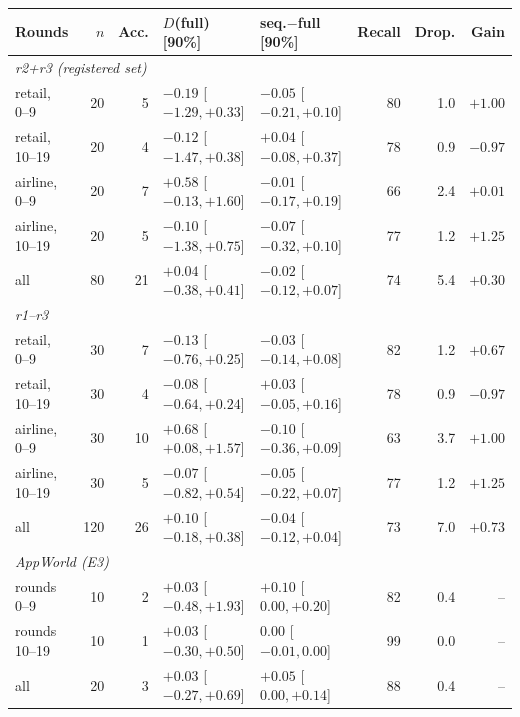 \begin{tabular}{@{}lrrllrrr@{}}
\toprule
Rounds & $n$ & Acc. & $D$(full) [90\%] & seq.$-$full [90\%] & Recall & Drop. & Gain \\
\midrule
\multicolumn{8}{l}{\emph{r2+r3 (registered set)}} \\
retail, 0--9 & 20 & 5 & $-0.19$ [$-1.29, +0.33$] & $-0.05$ [$-0.21, +0.10$] & 80 & 1.0 & $+1.00$ \\
retail, 10--19 & 20 & 4 & $-0.12$ [$-1.47, +0.38$] & $+0.04$ [$-0.08, +0.37$] & 78 & 0.9 & $-0.97$ \\
airline, 0--9 & 20 & 7 & $+0.58$ [$-0.13, +1.60$] & $-0.01$ [$-0.17, +0.19$] & 66 & 2.4 & $+0.01$ \\
airline, 10--19 & 20 & 5 & $-0.10$ [$-1.38, +0.75$] & $-0.07$ [$-0.32, +0.10$] & 77 & 1.2 & $+1.25$ \\
all & 80 & 21 & $+0.04$ [$-0.38, +0.41$] & $-0.02$ [$-0.12, +0.07$] & 74 & 5.4 & $+0.30$ \\
\multicolumn{8}{l}{\emph{r1--r3}} \\
retail, 0--9 & 30 & 7 & $-0.13$ [$-0.76, +0.25$] & $-0.03$ [$-0.14, +0.08$] & 82 & 1.2 & $+0.67$ \\
retail, 10--19 & 30 & 4 & $-0.08$ [$-0.64, +0.24$] & $+0.03$ [$-0.05, +0.16$] & 78 & 0.9 & $-0.97$ \\
airline, 0--9 & 30 & 10 & $+0.68$ [$+0.08, +1.57$] & $-0.10$ [$-0.36, +0.09$] & 63 & 3.7 & $+1.00$ \\
airline, 10--19 & 30 & 5 & $-0.07$ [$-0.82, +0.54$] & $-0.05$ [$-0.22, +0.07$] & 77 & 1.2 & $+1.25$ \\
all & 120 & 26 & $+0.10$ [$-0.18, +0.38$] & $-0.04$ [$-0.12, +0.04$] & 73 & 7.0 & $+0.73$ \\
\multicolumn{8}{l}{\emph{AppWorld (E3)}} \\
rounds 0--9 & 10 & 2 & $+0.03$ [$-0.48, +1.93$] & $+0.10$ [$0.00, +0.20$] & 82 & 0.4 & -- \\
rounds 10--19 & 10 & 1 & $+0.03$ [$-0.30, +0.50$] & $0.00$ [$-0.01, 0.00$] & 99 & 0.0 & -- \\
all & 20 & 3 & $+0.03$ [$-0.27, +0.69$] & $+0.05$ [$0.00, +0.14$] & 88 & 0.4 & -- \\
\bottomrule
\end{tabular}
